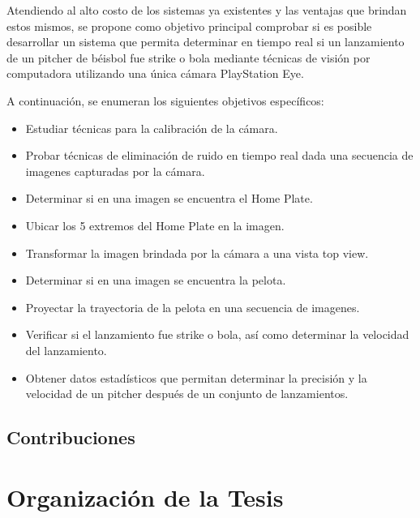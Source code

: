 Atendiendo al alto costo de los sistemas ya existentes y las ventajas que brindan estos mismos, se propone como objetivo principal comprobar si es posible desarrollar un sistema que permita determinar en tiempo real si un lanzamiento de un pitcher de béisbol fue strike o bola mediante técnicas de visión por computadora utilizando una única cámara PlayStation Eye.

A continuación, se enumeran los siguientes objetivos específicos:
\begin{itemize}
    \item {Estudiar técnicas para la calibración de la cámara.}
    \item {Probar técnicas de eliminación de ruido en tiempo real dada una secuencia de imagenes capturadas por la cámara.}
    \item {Determinar si en una imagen se encuentra el Home Plate.}
    \item {Ubicar los 5 extremos del Home Plate en la imagen.}
    \item {Transformar la imagen brindada por la cámara a una vista top view.}
    \item {Determinar si en una imagen se encuentra la pelota.}
    \item {Proyectar la trayectoria de la pelota en una secuencia de imagenes.}
    \item {Verificar si el lanzamiento fue strike o bola, así como determinar la velocidad del lanzamiento.}
    \item {Obtener datos estadísticos que permitan determinar la precisión y la velocidad de un pitcher después de un conjunto de lanzamientos.}
\end{itemize}

\subsection*{Contribuciones}

\section*{Organización de la Tesis}


